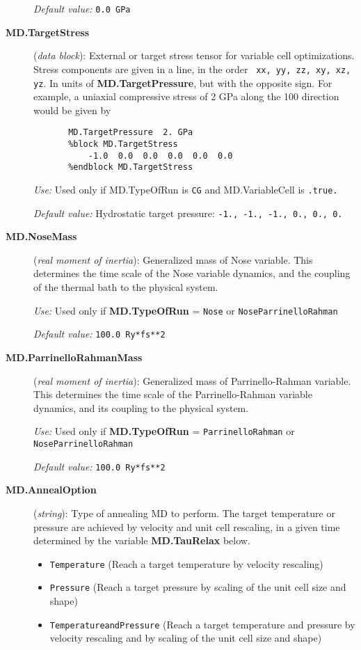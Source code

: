 \documentclass[11pt]{article}
\begin{document}
\begin{description}
{\it Default value:} {\tt 0.0 GPa}


\item[{\bf MD.TargetStress}] ({\it data block}):
External or target stress tensor for variable cell optimizations.
Stress components are given in a line, in the order {\tt
xx, yy, zz, xy, xz, yz}. In units of {\bf MD.TargetPressure},
but with the opposite sign. For example, a uniaxial compressive stress 
of 2 GPa along the 100 direction would be given by
\begin{verbatim}
       MD.TargetPressure  2. GPa
       %block MD.TargetStress
           -1.0  0.0  0.0  0.0  0.0  0.0
       %endblock MD.TargetStress
\end{verbatim}

{\it Use:} Used only if MD.TypeOfRun is {\tt CG} and 
MD.VariableCell is {\tt .true.} 
 
{\it Default value:} Hydrostatic target pressure: 
{\tt -1., -1., -1., 0., 0., 0.}



\item[{\bf MD.NoseMass}] ({\it real moment of inertia}): 
Generalized mass of Nose variable.
This determines the time scale of the Nose variable
dynamics, and the coupling of the thermal bath to
the physical system.

{\it Use:} Used only if {\bf MD.TypeOfRun} = {\tt Nose} or 
{\tt NoseParrinelloRahman}

{\it Default value:} {\tt 100.0 Ry*fs**2}

\item[{\bf MD.ParrinelloRahmanMass}] ({\it real moment of inertia}): 
Generalized mass of Parrinello-Rahman variable.
This determines the time scale 
of the Parrinello-Rahman variable
dynamics, and its coupling to
the physical system.

{\it Use:} Used only if {\bf MD.TypeOfRun} = {\tt ParrinelloRahman} 
or {\tt NoseParrinelloRahman}

{\it Default value:} {\tt 100.0 Ry*fs**2}

\item[{\bf MD.AnnealOption}] ({\it string}): 
Type of annealing MD to perform. The target temperature or pressure are
achieved by velocity and unit cell rescaling, 
in a given time determined by the variable
{\bf MD.TauRelax} below.
\begin{itemize}
\item {\tt Temperature} (Reach a target temperature by velocity rescaling)
\item {\tt Pressure} (Reach a target pressure by scaling of the unit
cell size and shape)
\item {\tt TemperatureandPressure}  (Reach a target temperature 
and pressure by velocity rescaling and by scaling of the unit
cell size and shape)
\end{itemize}


\end{description}
\end{document}
